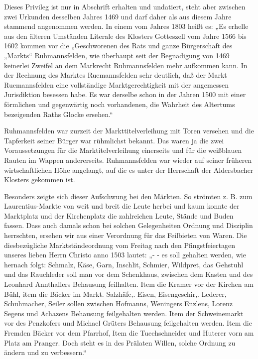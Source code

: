 \documentclass[12pt,a4paper]{book}
\begin{document}
Dieses Privileg ist nur in Abschrift erhalten und undatiert, steht aber
zwischen zwei Urkunden desselben Jahres 1469 und darf daher als aus
diesem Jahre stammend angenommen werden. In einem vom Jahres 1803 heißt
es: „Es erhelle aus den älteren Umständen Literale des Klosters
Gotteszell vom Jahre 1566 bis 1602 kommen vor die „Geschworenen des Rats
und ganze Bürgerschaft des „Markts“ Ruhmannsfelden, wie überhaupt seit
der Begnadigung von 1469 keinerlei Zweifel an dem Markrecht
Ruhmannsfelden mehr aufkommen kann. In der Rechnung des Marktes
Ruemannsfelden sehr deutlich, daß der Markt Ruemannsfelden eine
vollständige Marktgerechtigkeit mit der angemessen Jurisdiktion besessen
habe. Es war derselbe schon in der Jahren 1500 mit einer förmlichen und
gegenwärtig noch vorhandenen, die Wahrheit des Altertums bezeigenden
Raths Glocke ersehen.“

Ruhmannsfelden war zurzeit der Markttitelverleihung mit Toren versehen
und die Tapferkeit seiner Bürger war rühmlichst bekannt. Das waren ja
die zwei Voraussetzungen für die Marktitelverleihung einerseits und für
die weißblauen Rauten im Wappen andererseits. Ruhmannsfelden war wieder
auf seiner früheren wirtschaftlichen Höhe angelangt, auf die es unter
der Herrschaft der Aldersbacher Klosters gekommen ist.

Besonders zeigte sich dieser Aufschwung bei den Märkten. So strömten z.
B. zum Laurentius-Markte von weit und breit die Leute herbei und kaum
konnte der Marktplatz und der Kirchenplatz die zahlreichen Leute, Stände
und Buden fassen. Dass auch damals schon bei solchen Gelegenheiten
Ordnung und Disziplin herrschten, ersehen wir aus einer Verordnung für
das Feilbieten von Waren. Die diesbezügliche Marktständeordnung vom
Freitag nach den Pfingstfeiertagen unseres lieben Herrn Christo anno
1503 lautet: „- - es soll gehalten werden, wie hernach folgt: Schmalz,
Käse, Garn, Inschlit, Schmier, Wildpret, das Gehstuhl und das Rauchleder
soll man vor dem Schenkhaus, zwischen dem Kasten und des Leonhard
Annthallers Behausung feilhalten. Item die Kramer vor der Kirchen am
Bühl, item die Bäcker im Markt. Salzhäfe,. Eisen, Eisengeschir,.
Lederer, Schuhmacher, Seiler sollen zwischen Hofmanns, Weningers
Enzlens, Lorenz Segens und Achazens Behausung feilgehalten werden. Item
der Schweinemarkt vor des Penzkofers und Michael Grüters Behausung
feilgehalten werden. Item die Fremden Bäcker vor dem Pfarrhof, Item die
Tuechschneider und Huterer vorn am Platz am Pranger. Doch steht es in
des Prälaten Willen, solche Ordnung zu ändern und zu verbessern.“
\end{document}
